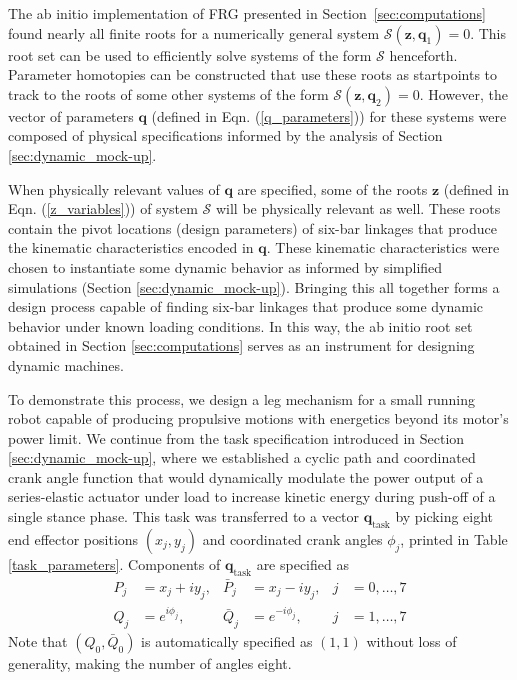 \documentclass[journal]{IEEEtran}
\def\*#1{\bar{#1}} %
\begin{document}
The ab initio implementation of FRG presented in Section~\ref{sec:computations} found nearly all finite roots for a numerically general system $\mathcal{S}(\mathbf{z},\mathbf{q}_1)=0$.
This root set can be used to efficiently solve systems of the form $\mathcal{S}$ henceforth.
Parameter homotopies can be constructed that use these roots as startpoints to track to the roots of some other systems of the form $\mathcal{S}(\mathbf{z},\mathbf{q}_2)=0$.
However, the vector of parameters $\mathbf{q}$ (defined in Eqn. (\ref{q_parameters})) for these systems were composed of physical specifications informed by the analysis of Section \ref{sec:dynamic_mock-up}.

When physically relevant values of $\mathbf{q}$ are specified, some of the roots $\mathbf{z}$ (defined in Eqn. (\ref{z_variables})) of system $\mathcal{S}$ will be physically relevant as well.
These roots contain the pivot locations (design parameters) of six-bar linkages that produce the kinematic characteristics encoded in $\mathbf{q}$.
These kinematic characteristics were chosen to instantiate some dynamic behavior as informed by simplified simulations (Section \ref{sec:dynamic_mock-up}).
Bringing this all together forms a design process capable of finding six-bar linkages that produce some dynamic behavior under known loading conditions.
In this way, the ab initio root set obtained in Section \ref{sec:computations} serves as an instrument for designing dynamic machines.



To demonstrate this process, we design a leg mechanism for a small running robot capable of producing propulsive motions with energetics beyond its motor's power limit.
We continue from the task specification introduced in Section \ref{sec:dynamic_mock-up}, where we established a cyclic path and coordinated crank angle function that would dynamically modulate the power output of a series-elastic actuator under load to increase kinetic energy during push-off of a single stance phase.
This task was transferred to a vector $\mathbf{q}_\text{task}$ by picking eight end effector positions $(x_j,y_j)$ and coordinated crank angles $\phi_j$, printed in Table \ref{task_parameters}.  Components of $\mathbf{q}_\text{task}$ are specified as
\begin{align}
P_j &= x_j + iy_j, & \*P_j &= x_j - iy_j, & j&=0,\ldots,7 \nonumber\\
Q_j &= e^{i\phi_j}, & \*Q_j &= e^{-i\phi_j}, & j&=1,\ldots,7 
\end{align}
Note that $(Q_0,\*Q_0)$ is automatically specified as $(1,1)$ without loss of generality, making the number of angles eight.
\end{document}
